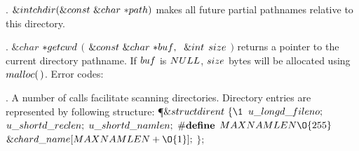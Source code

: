 \fi

. \CD{}$\&{int}\ \\{chdir}(\&{const}\ \&{char}\ {*}\\{path})$\DC{} makes
all future partial pathnames relative to this
directory.

\fi

. \CD{}$\&{char}$ ${{*}}\\{getcwd}$ $($ $\&{const}\ \&{char}\ {{*}}\\{buf},%
\;\ \&{int}$ $\\{size}$ $)$\DC{} returns a pointer to the current directory
pathname. If \CD{}$\\{buf}$\DC{} is \CD{}$\\{NULL}$\DC{}, \CD{}$\\{size}$\DC{}
bytes will be allocated using \CD{}$\\{malloc}(\,)$\DC{}.
\medskip
Error codes:
\medskip{}

\fi

. A number of calls facilitate scanning directories. Directory entries are
represented by
following structure:
\Y\P $\&{struct}\ \\{dirent}\ \{\1$\6
$\\{u\_long}\ \\{d\_fileno};$\5
\6
$\\{u\_short}\ \\{d\_reclen};$\5
\6
$\\{u\_short}\ \\{d\_namlen};$\5
\6
\8$\#{\let\\=\bf \\{define}}$\1{} $\\{MAXNAMLEN}\O{255}$\2\6
$\&{char}\ \\{d\_name}[\\{MAXNAMLEN}+\O{1}];$\5
\2\6
$\};$\par
\fi

